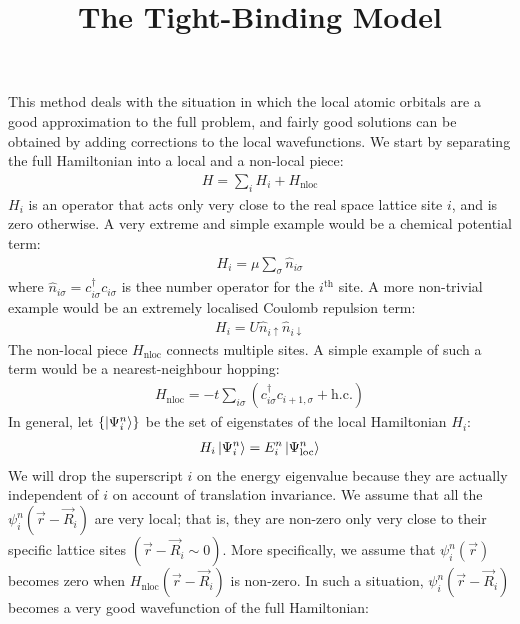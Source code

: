 \documentclass[12pt]{article}
\title{The Tight-Binding Model}
\author{}
\numberwithin{equation}{section}
\begin{document}
\maketitle
This method deals with the situation in which the local atomic orbitals are a good approximation to the full problem, and fairly good solutions can be obtained by adding corrections to the local wavefunctions. We start by separating the full Hamiltonian into a local and a non-local piece:
\begin{equation}\begin{aligned}
	H = \sum_i H_i + H_\text{nloc}
\end{aligned}\end{equation}
$H_i$ is an operator that acts only very close to the real space lattice site \(i\), and is zero otherwise. A very extreme and simple example would be a chemical potential term:
\begin{equation}\begin{aligned}
	H_i = \mu \sum_{\sigma} \hat n_{i\sigma}
\end{aligned}\end{equation}
where \(\hat n_{i\sigma} = c^\dagger_{i \sigma}c_{i \sigma}\) is thee number operator for the $i^\text{th}$ site.
A more non-trivial example would be an extremely localised Coulomb repulsion term:
\begin{equation}\begin{aligned}
	H_i =  U\hat n_{i \uparrow}\hat n_{i \downarrow}
\end{aligned}\end{equation}
The non-local piece $H_\text{nloc}$ connects multiple sites. A simple example of such a term would be a nearest-neighbour hopping:
\begin{equation}\begin{aligned}
	H_\text{nloc} =  -t\sum_{i\sigma} \left(c^\dagger_{i\sigma}c_{i+1,\sigma} + \text{h.c.}\right)
\end{aligned}\end{equation}
In general, let $\left\{\ket{\Psi^n_i}\right\}$ be the set of eigenstates of the local Hamiltonian \(H_i\):
\begin{equation}\begin{aligned}
	H_i \ket{\Psi_i^n} = E^n_i\ket{\Psi_\text{loc}^n}
\end{aligned}\end{equation}
We will drop the superscript $i$ on the energy eigenvalue because they are actually independent of $i$ on account of translation invariance.
We assume that all the \(\psi_i^n(\vec r - \vec R_i)\) are very local; that is, they are non-zero only very close to their specific lattice sites \(\left( \vec r - \vec R_i \sim 0 \right) \). More specifically, we assume that \(\psi_i^n(\vec r)\) becomes zero when $H_\text{nloc}(\vec r - \vec R_i)$ is non-zero. In such a situation, \(\psi_i^n(\vec r - \vec R_i)\) becomes a very good wavefunction of the full Hamiltonian:
\end{document}
